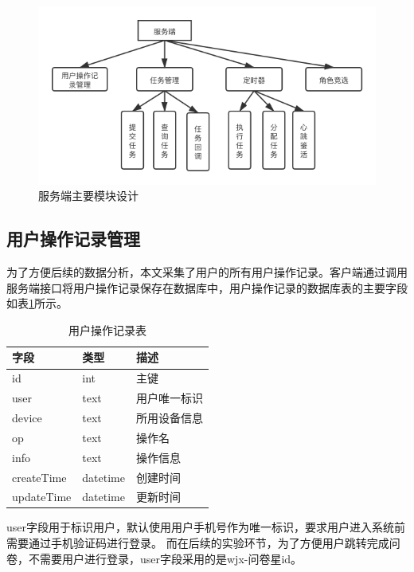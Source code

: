 \begin{figure}[ht]
    \centering
    \includegraphics[width=12cm]{images/server7.png}
    \caption{服务端主要模块设计}
    \label{fig:server}
\end{figure}


\subsection{用户操作记录管理}
为了方便后续的数据分析，本文采集了用户的所有用户操作记录。客户端通过调用服务端接口将用户操作记录保存在数据库中，用户操作记录的数据库表的主要字段如表\ref{tab:op_log}所示。

\begin{table}[]
    \centering
    \caption{用户操作记录表}
    \begin{tabular}{lll}
        \toprule
        字段 & 类型 & 描述 \\ 
        \midrule
        id & int & 主键 \\
        user & text & 用户唯一标识 \\ 
        device & text & 所用设备信息 \\
        op & text & 操作名 \\
        info & text & 操作信息 \\
        createTime & datetime & 创建时间 \\
        updateTime & datetime & 更新时间\\
        \bottomrule
    \end{tabular}
    \label{tab:op_log}
\end{table}


user字段用于标识用户，默认使用用户手机号作为唯一标识，要求用户进入系统前需要通过手机验证码进行登录。
而在后续的实验环节，为了方便用户跳转完成问卷，不需要用户进行登录，user字段采用的是wjx-问卷星id。

